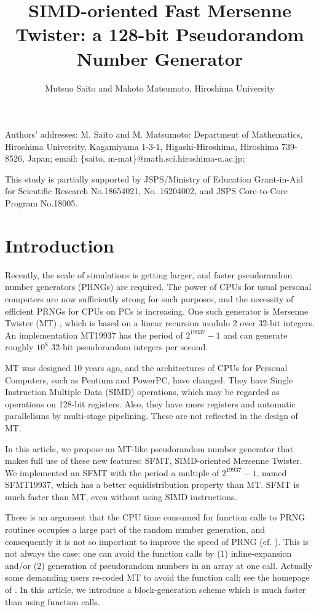\documentclass[acmnow]{acmtrans2m}
\title{SIMD-oriented Fast Mersenne Twister:
a 128-bit Pseudorandom Number Generator
}
\author{Mutsuo Saito and Makoto Matsumoto, Hiroshima University \\
}
\begin{document}
\maketitle

\begin{bottomstuff}
Authors' addresses: 
M. Saito and M. Matsumoto: Department of Mathematics, Hiroshima University,
Kagamiyama 1-3-1, Higashi-Hiroshima, Hiroshima 739-8526, Japan;
email: \{saito, m-mat\}@math.sci.hiroshima-u.ac.jp;

This study is partially supported by JSPS/Ministry of Education
Grant-in-Aid for Scientific Research No.18654021, No. 16204002,
and JSPS Core-to-Core Program No.18005.
\end{bottomstuff}

\section{Introduction}
Recently, the scale of simulations is getting larger,
and faster pseudorandom number generators (PRNGs)
are required. The power of CPUs for
usual personal computers are now sufficiently strong
for such purposes, and the necessity of efficient PRNGs 
for CPUs on PCs is increasing.
One such generator is Mersenne Twister (MT) \cite{MT},
which is based on a linear recursion modulo 2 over 32-bit
integers. An implementation MT19937 has 
the period of $2^{19937}-1$ and 
can generate
roughly $10^8$ 32-bit pseudorandom integers per second.

MT was designed 10 years ago,
and the architectures of CPUs for Personal Computers,
such as Pentium and PowerPC, have changed.
They have
Single Instruction Multiple Data (SIMD) operations,
which may be regarded as operations 
on 128-bit registers. Also, they have more registers
and automatic parallelisms by multi-stage pipelining. 
These are not reflected in the design of MT. 

In this article, we propose an MT-like 
pseudorandom number generator
that makes full use of these new features: SFMT, 
SIMD-oriented Mersenne Twister. 
We implemented an SFMT with the period a multiple of $2^{19937}-1$, named
SFMT19937,
which has a better equidistribution property than MT. 
SFMT is much faster than MT, even without using SIMD instructions. 

There is an argument that the CPU time consumed for 
function calls to PRNG routines occupies a large part of
the random number generation, and consequently 
it is not so important to improve the speed of PRNG 
(cf. \cite{XORSHIFT}).
This is not always the case: 
one can avoid the function calls by (1) inline-expansion
and/or (2) generation of pseudorandom numbers in an array
at one call. Actually some demanding users re-coded MT to avoid the 
function call; see the homepage of \cite{MT}. 
In this article, we introduce a block-generation scheme which 
is much faster than using function calls.
\end{document}
